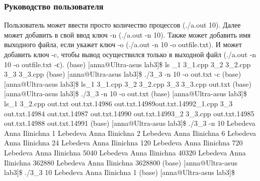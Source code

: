 \documentclass[a4paper,12pt]{extarticle}
\begin{document}
\subsubsection{Руководство пользователя}
Пользователь может ввести просто количество процессов (./a.out 10). Далее может добавить в свой ввод ключ -n (./a.out -n 10). Также может добавить имя выходного файла, если укажет ключ -o (./a.out -n 10 -o outfile.txt). И может добавить ключ -c, чтобы вывод осуществился только в выходной файл (./a.out -n 10 -o outfile.txt -с). \newline
(base) [anna@Ultra-asus lab3]\$ ls \_1  3\_1.cpp  3\_2  3\_2.cpp  3\_3  3\_3.cpp \newline
(base) [anna@Ultra-asus lab3]\$ ./3\_3 -n 10 -o out.txt -c\newline
(base) [anna@Ultra-asus lab3]\$ ls\_1  3\_1.cpp  3\_2  3\_2.cpp  3\_3  3\_3.cpp  out.txt\newline
(base) [anna@Ultra-asus lab3]\$ ./3\_3 -n 10 -o out.txt\newline
(base) [anna@Ultra-asus lab3]\$ ls\_1      3\_2.cpp  out.txt        out.txt.14986  out.txt.14989\newline  out.txt.14992\_1.cpp  3\_3      out.txt.14984  out.txt.14987  out.txt.14990 \newline out.txt.14993\_2      3\_3.cpp  out.txt.14985  out.txt.14988  out.txt.14991\newline
(base) [anna@Ultra-asus lab3]\$ ./3\_3 -n 10\newline
Lebedeva Anna Ilinichna 1\newline
Lebedeva Anna Ilinichna 2\newline
Lebedeva Anna Ilinichna 6\newline
Lebedeva Anna Ilinichna 24\newline
Lebedeva Anna Ilinichna 120\newline
Lebedeva Anna Ilinichna 720\newline
Lebedeva Anna Ilinichna 5040\newline
Lebedeva Anna Ilinichna 40320\newline
Lebedeva Anna Ilinichna 362880\newline
Lebedeva Anna Ilinichna 3628800\newline
(base) [anna@Ultra-asus lab3]\$ ./3\_3 10\newline
Lebedeva Anna Ilinichna 1\newline
(base) [anna@Ultra-asus lab3]\$ \newline
\end{document}

